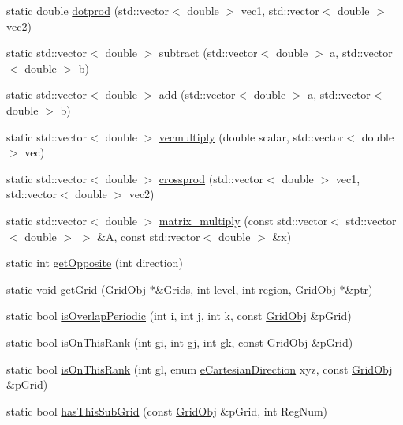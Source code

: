 \begin{DoxyCompactItemize}
\item 
static double \hyperlink{class_grid_utils_af374256beaf42d97b23f7d98af93a3f1}{dotprod} (std\+::vector$<$ double $>$ vec1, std\+::vector$<$ double $>$ vec2)
\item 
static std\+::vector$<$ double $>$ \hyperlink{class_grid_utils_a6f5af65d6bb25e0d34be50670b41514f}{subtract} (std\+::vector$<$ double $>$ a, std\+::vector$<$ double $>$ b)
\item 
static std\+::vector$<$ double $>$ \hyperlink{class_grid_utils_a4e9fc081a19660e9db39428014c04a9c}{add} (std\+::vector$<$ double $>$ a, std\+::vector$<$ double $>$ b)
\item 
static std\+::vector$<$ double $>$ \hyperlink{class_grid_utils_a01eba1d90d3414637d5031850ad89ce3}{vecmultiply} (double scalar, std\+::vector$<$ double $>$ vec)
\item 
static std\+::vector$<$ double $>$ \hyperlink{class_grid_utils_aeb315c03a681483339de9f60ab2964d6}{crossprod} (std\+::vector$<$ double $>$ vec1, std\+::vector$<$ double $>$ vec2)
\item 
static std\+::vector$<$ double $>$ \hyperlink{class_grid_utils_a0051918813c63802d79bd7d172e8ad8a}{matrix\+\_\+multiply} (const std\+::vector$<$ std\+::vector$<$ double $>$ $>$ \&A, const std\+::vector$<$ double $>$ \&x)
\item 
static int \hyperlink{class_grid_utils_af3c54e468658879756c71b01abd028d5}{get\+Opposite} (int direction)
\item 
static void \hyperlink{class_grid_utils_afac10170d3f6f96a32da6a783b815954}{get\+Grid} (\hyperlink{class_grid_obj}{Grid\+Obj} $\ast$\&Grids, int level, int region, \hyperlink{class_grid_obj}{Grid\+Obj} $\ast$\&ptr)
\item 
static bool \hyperlink{class_grid_utils_a7c13884020ab181ee8cb6dd2ea7e4fd7}{is\+Overlap\+Periodic} (int i, int j, int k, const \hyperlink{class_grid_obj}{Grid\+Obj} \&p\+Grid)
\item 
static bool \hyperlink{class_grid_utils_ac1c2d23d0cdd548368aaaffb4f22502d}{is\+On\+This\+Rank} (int gi, int gj, int gk, const \hyperlink{class_grid_obj}{Grid\+Obj} \&p\+Grid)
\item 
static bool \hyperlink{class_grid_utils_a1d9558846f757c6f60fa61f104b63071}{is\+On\+This\+Rank} (int gl, enum \hyperlink{_grid_utils_8h_afbad8e4a2f1e9903755b1bd2fe8273cf}{e\+Cartesian\+Direction} xyz, const \hyperlink{class_grid_obj}{Grid\+Obj} \&p\+Grid)
\item 
static bool \hyperlink{class_grid_utils_a0863e64842ddc907d0a2ab22b9624e07}{has\+This\+Sub\+Grid} (const \hyperlink{class_grid_obj}{Grid\+Obj} \&p\+Grid, int Reg\+Num)

\end{DoxyCompactItemize}
